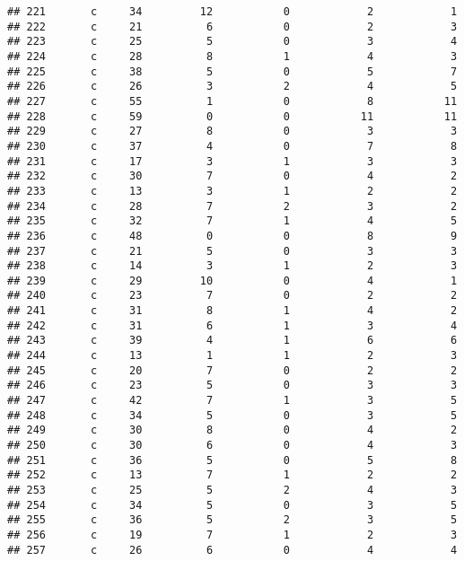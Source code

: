 \documentclass[
]{article}
\begin{document}
\begin{verbatim}
## 221       c     34         12           0            2            1
## 222       c     21          6           0            2            3
## 223       c     25          5           0            3            4
## 224       c     28          8           1            4            3
## 225       c     38          5           0            5            7
## 226       c     26          3           2            4            5
## 227       c     55          1           0            8           11
## 228       c     59          0           0           11           11
## 229       c     27          8           0            3            3
## 230       c     37          4           0            7            8
## 231       c     17          3           1            3            3
## 232       c     30          7           0            4            2
## 233       c     13          3           1            2            2
## 234       c     28          7           2            3            2
## 235       c     32          7           1            4            5
## 236       c     48          0           0            8            9
## 237       c     21          5           0            3            3
## 238       c     14          3           1            2            3
## 239       c     29         10           0            4            1
## 240       c     23          7           0            2            2
## 241       c     31          8           1            4            2
## 242       c     31          6           1            3            4
## 243       c     39          4           1            6            6
## 244       c     13          1           1            2            3
## 245       c     20          7           0            2            2
## 246       c     23          5           0            3            3
## 247       c     42          7           1            3            5
## 248       c     34          5           0            3            5
## 249       c     30          8           0            4            2
## 250       c     30          6           0            4            3
## 251       c     36          5           0            5            8
## 252       c     13          7           1            2            2
## 253       c     25          5           2            4            3
## 254       c     34          5           0            3            5
## 255       c     36          5           2            3            5
## 256       c     19          7           1            2            3
## 257       c     26          6           0            4            4

\end{verbatim}
\end{document}
